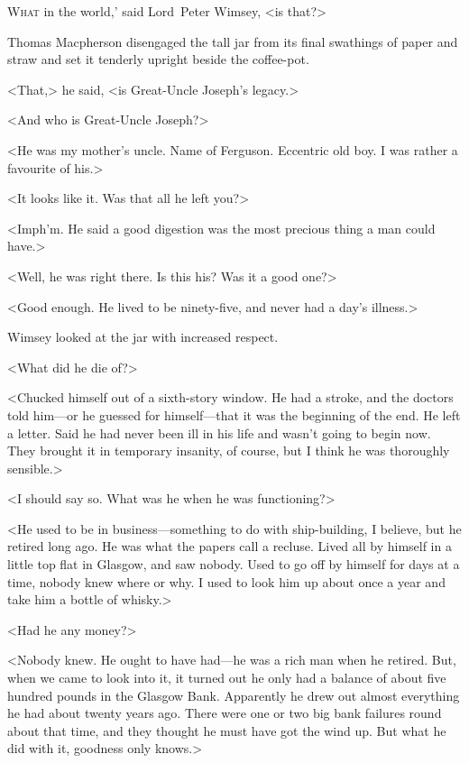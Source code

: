 
\lettrine[lines=4,ante=‘]{W}{hat} in the world,' said Lord~Peter Wimsey, <is that?>

\zz
Thomas Macpherson disengaged the tall jar from its final swathings of paper and straw and set it tenderly upright beside the coffee-pot.

<That,> he said, <is Great-Uncle Joseph's legacy.>

<And who is Great-Uncle Joseph?>

<He was my mother's uncle. Name of Ferguson. Eccentric old boy. I was rather a favourite of his.>

<It looks like it. Was that all he left you?>

<Imph'm. He said a good digestion was the most precious thing a man could have.>

<Well, he was right there. Is this his? Was it a good one?>

<Good enough. He lived to be ninety-five, and never had a day's illness.>

Wimsey looked at the jar with increased respect.

<What did he die of?>

<Chucked himself out of a sixth-story window. He had a stroke, and the doctors told him—or he guessed for himself—that it was the beginning of the end. He left a letter. Said he had never been ill in his life and wasn't going to begin now. They brought it in temporary insanity, of course, but I think he was thoroughly sensible.>

<I should say so. What was he when he was functioning?>

<He used to be in business—something to do with ship-building, I believe, but he retired long ago. He was what the papers call a recluse. Lived all by himself in a little top flat in Glasgow, and saw nobody. Used to go off by himself for days at a time, nobody knew where or why. I used to look him up about once a year and take him a bottle of whisky.>

<Had he any money?>

<Nobody knew. He ought to have had—he was a rich man when he retired. But, when we came to look into it, it turned out he only had a balance of about five hundred pounds in the Glasgow Bank. Apparently he drew out almost everything he had about twenty years ago. There were one or two big bank failures round about that time, and they thought he must have got the wind up. But what he did with it, goodness only knows.>

